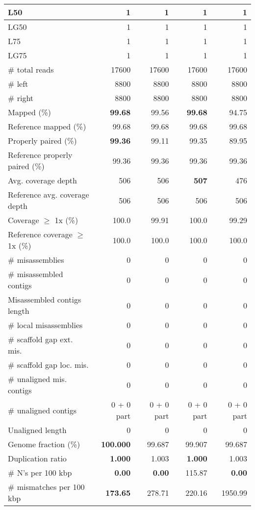\documentclass[12pt,a4paper]{article}
\begin{document}
\begin{table}[ht]
\begin{center}
\begin{tabular}{|l*{4}{|r}|}
L50 & 1 & 1 & 1 & 1 \\ \hline
LG50 & 1 & 1 & 1 & 1 \\ \hline
L75 & 1 & 1 & 1 & 1 \\ \hline
LG75 & 1 & 1 & 1 & 1 \\ \hline
\# total reads & 17600 & 17600 & 17600 & 17600 \\ \hline
\# left & 8800 & 8800 & 8800 & 8800 \\ \hline
\# right & 8800 & 8800 & 8800 & 8800 \\ \hline
Mapped (\%) & {\bf 99.68} & 99.56 & {\bf 99.68} & 94.75 \\ \hline
Reference mapped (\%) & 99.68 & 99.68 & 99.68 & 99.68 \\ \hline
Properly paired (\%) & {\bf 99.36} & 99.11 & 99.35 & 89.95 \\ \hline
Reference properly paired (\%) & 99.36 & 99.36 & 99.36 & 99.36 \\ \hline
Avg. coverage depth & 506 & 506 & {\bf 507} & 476 \\ \hline
Reference avg. coverage depth & 506 & 506 & 506 & 506 \\ \hline
Coverage $\geq$ 1x (\%) & 100.0 & 99.91 & 100.0 & 99.29 \\ \hline
Reference coverage $\geq$ 1x (\%) & 100.0 & 100.0 & 100.0 & 100.0 \\ \hline
\# misassemblies & 0 & 0 & 0 & 0 \\ \hline
\# misassembled contigs & 0 & 0 & 0 & 0 \\ \hline
Misassembled contigs length & 0 & 0 & 0 & 0 \\ \hline
\# local misassemblies & 0 & 0 & 0 & 0 \\ \hline
\# scaffold gap ext. mis. & 0 & 0 & 0 & 0 \\ \hline
\# scaffold gap loc. mis. & 0 & 0 & 0 & 0 \\ \hline
\# unaligned mis. contigs & 0 & 0 & 0 & 0 \\ \hline
\# unaligned contigs & 0 + 0 part & 0 + 0 part & 0 + 0 part & 0 + 0 part \\ \hline
Unaligned length & 0 & 0 & 0 & 0 \\ \hline
Genome fraction (\%) & {\bf 100.000} & 99.687 & 99.907 & 99.687 \\ \hline
Duplication ratio & {\bf 1.000} & 1.003 & {\bf 1.000} & 1.003 \\ \hline
\# N's per 100 kbp & {\bf 0.00} & {\bf 0.00} & 115.87 & {\bf 0.00} \\ \hline
\# mismatches per 100 kbp & {\bf 173.65} & 278.71 & 220.16 & 1950.99 \\ \hline

\end{tabular}
\end{center}
\end{table}
\end{document}
